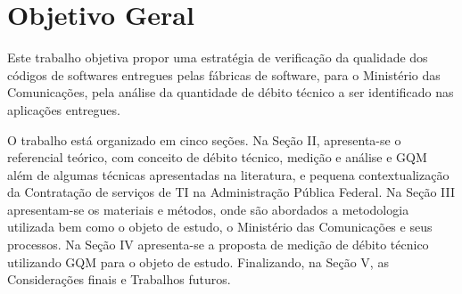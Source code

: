 \section{Objetivo Geral}
 Este trabalho objetiva propor uma estratégia de verificação da qualidade dos
 códigos de softwares entregues pelas fábricas de software, para o Ministério
 das Comunicações, pela análise da quantidade de débito técnico a ser identificado
 nas aplicações entregues.

 O trabalho está organizado em cinco seções. Na Seção II, apresenta-se o
 referencial teórico, com conceito de débito técnico, medição e análise e GQM
 além de algumas técnicas
 apresentadas na literatura, e pequena contextualização da Contratação de
 serviços de TI na Administração Pública Federal. Na Seção III apresentam-se
 os materiais e métodos, onde são abordados a metodologia utilizada bem como o
 objeto de estudo, o Ministério das Comunicações e seus processos. Na Seção IV
 apresenta-se a proposta de medição de débito técnico utilizando GQM para o objeto de estudo.
 Finalizando, na Seção V, as Considerações finais e Trabalhos futuros.
